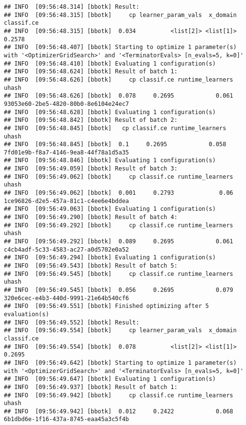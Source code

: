 \documentclass[
]{scrbook}
\begin{document}
\begin{verbatim}
## INFO  [09:56:48.314] [bbotk] Result: 
## INFO  [09:56:48.315] [bbotk]     cp learner_param_vals  x_domain classif.ce 
## INFO  [09:56:48.315] [bbotk]  0.034          <list[2]> <list[1]>     0.2578 
## INFO  [09:56:48.407] [bbotk] Starting to optimize 1 parameter(s) with '<OptimizerGridSearch>' and '<TerminatorEvals> [n_evals=5, k=0]' 
## INFO  [09:56:48.410] [bbotk] Evaluating 1 configuration(s) 
## INFO  [09:56:48.624] [bbotk] Result of batch 1: 
## INFO  [09:56:48.626] [bbotk]     cp classif.ce runtime_learners                                uhash 
## INFO  [09:56:48.626] [bbotk]  0.078     0.2695            0.061 93053e60-2be5-4820-80b0-8e6104e24ec7 
## INFO  [09:56:48.628] [bbotk] Evaluating 1 configuration(s) 
## INFO  [09:56:48.842] [bbotk] Result of batch 2: 
## INFO  [09:56:48.845] [bbotk]   cp classif.ce runtime_learners                                uhash 
## INFO  [09:56:48.845] [bbotk]  0.1     0.2695            0.058 7fd01e9b-f8a7-4146-9ea8-44f78a1d5a35 
## INFO  [09:56:48.846] [bbotk] Evaluating 1 configuration(s) 
## INFO  [09:56:49.059] [bbotk] Result of batch 3: 
## INFO  [09:56:49.062] [bbotk]     cp classif.ce runtime_learners                                uhash 
## INFO  [09:56:49.062] [bbotk]  0.001     0.2793             0.06 1ce96826-d2e5-457a-81c1-c4ee6e4bddea 
## INFO  [09:56:49.063] [bbotk] Evaluating 1 configuration(s) 
## INFO  [09:56:49.290] [bbotk] Result of batch 4: 
## INFO  [09:56:49.292] [bbotk]     cp classif.ce runtime_learners                                uhash 
## INFO  [09:56:49.292] [bbotk]  0.089     0.2695            0.061 c4cb4adf-5c33-4583-ac27-a0d5702e0a52 
## INFO  [09:56:49.294] [bbotk] Evaluating 1 configuration(s) 
## INFO  [09:56:49.543] [bbotk] Result of batch 5: 
## INFO  [09:56:49.545] [bbotk]     cp classif.ce runtime_learners                                uhash 
## INFO  [09:56:49.545] [bbotk]  0.056     0.2695            0.079 320e6cec-e4b3-440d-9991-21e64b540cf6 
## INFO  [09:56:49.551] [bbotk] Finished optimizing after 5 evaluation(s) 
## INFO  [09:56:49.552] [bbotk] Result: 
## INFO  [09:56:49.554] [bbotk]     cp learner_param_vals  x_domain classif.ce 
## INFO  [09:56:49.554] [bbotk]  0.078          <list[2]> <list[1]>     0.2695 
## INFO  [09:56:49.642] [bbotk] Starting to optimize 1 parameter(s) with '<OptimizerGridSearch>' and '<TerminatorEvals> [n_evals=5, k=0]' 
## INFO  [09:56:49.647] [bbotk] Evaluating 1 configuration(s) 
## INFO  [09:56:49.937] [bbotk] Result of batch 1: 
## INFO  [09:56:49.942] [bbotk]     cp classif.ce runtime_learners                                uhash 
## INFO  [09:56:49.942] [bbotk]  0.012     0.2422            0.068 6b1dbd6e-1f16-437a-8745-eaa45a3c5f4b 

\end{verbatim}
\end{document}
